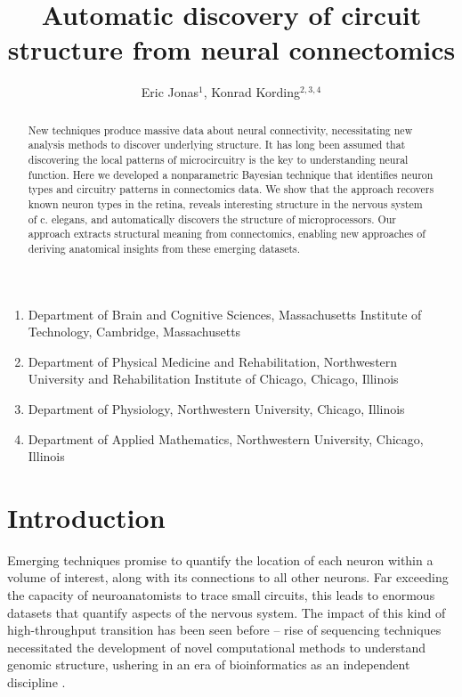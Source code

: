 \documentclass{article}
\title{Automatic discovery of circuit structure from neural connectomics}
\author{Eric Jonas$^1$, Konrad Kording$^{2, 3,4}$}
\begin{document}
\maketitle

\begin{small}
\begin{enumerate}
  \item Department of Brain and Cognitive Sciences, Massachusetts Institute of Technology, Cambridge, Massachusetts
  \item Department of Physical Medicine and Rehabilitation, Northwestern University and Rehabilitation Institute of Chicago, Chicago, Illinois
  \item Department of Physiology, Northwestern University, Chicago, Illinois
  \item Department of Applied Mathematics, Northwestern University, Chicago, Illinois
\end{enumerate}
\end{small}

\begin{abstract}
  New techniques produce massive data about neural connectivity,
  necessitating new analysis methods to discover underlying
  structure. It has long been assumed that discovering the local
  patterns of microcircuitry is the key to understanding neural
  function. Here we developed a nonparametric Bayesian technique that
  identifies neuron types and circuitry patterns in connectomics
  data. We show that the approach recovers known neuron types in the
  retina, reveals interesting structure in the nervous system of
  c. elegans, and automatically discovers the structure of
  microprocessors. Our approach extracts structural meaning from
  connectomics, enabling new approaches of deriving anatomical
  insights from these emerging datasets.


\end{abstract}

\section*{Introduction}
Emerging techniques \autocite{Morgan2013,Zador2012} promise to
quantify the location of each neuron within a volume of interest,
along with its connections to all other neurons. Far exceeding the
capacity of neuroanatomists to trace small circuits, this leads to
enormous datasets that quantify aspects of the nervous system. The impact of
this kind of high-throughput transition has been seen before -- 
rise of sequencing techniques necessitated the
development of novel computational methods to understand genomic
structure, ushering in an era of bioinformatics as an independent
discipline \autocite{Koboldt2013}.
\end{document}
